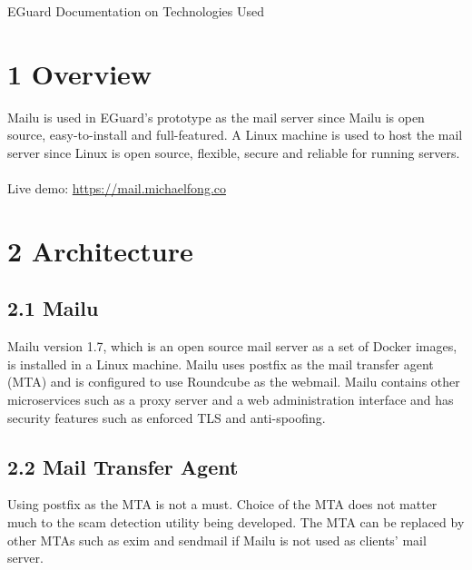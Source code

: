 \documentclass[11pt]{article}
\begin{document}






\begin{center}
\Huge{EGuard Documentation on Technologies Used}
\end{center}

\section*{\large{1 \hspace{10pt} Overview}}
Mailu is used in EGuard's prototype as the mail server since Mailu is open source, easy-to-install and full-featured. A Linux machine is used to host the mail server since Linux is open source, flexible, secure and reliable for running servers. \\
\\
Live demo: \href{https://mail.michaelfong.co}{https://mail.michaelfong.co}

\section*{\large{2 \hspace{10pt} Architecture}}
\subsection*{2.1 \hspace{10pt} Mailu}
Mailu version 1.7, which is an open source mail server as a set of Docker images, is installed in a Linux machine. Mailu uses postfix as the mail transfer agent (MTA) and is configured to use Roundcube as the webmail. Mailu contains other microservices such as a proxy server and a web administration interface and has security features such as enforced TLS and anti-spoofing.

\subsection*{2.2 \hspace{10pt} Mail Transfer Agent}
Using postfix as the MTA is not a must. Choice of the MTA does not matter much to the scam detection utility being developed. The MTA can be replaced by other MTAs such as exim and sendmail if Mailu is not used as clients' mail server. 
\end{document}
